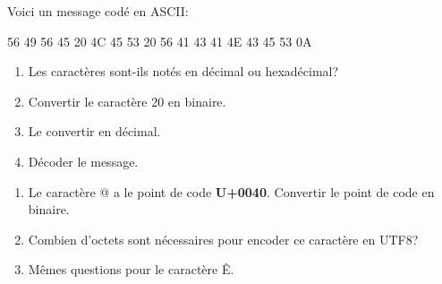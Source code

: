 \documentclass[a4paper,11pt]{article}
\begin{document}
\begin{exo}
Voici un message codé en ASCII:
\begin{center}
    56 49 56 45 20 4C 45 53 20 56 41 43 41 4E 43 45 53 0A
\end{center}
\begin{enumerate}
    \item Les caractères sont-ils notés en décimal ou hexadécimal?
    \item Convertir le caractère 20 en binaire.
    \item Le convertir en décimal.
    \item Décoder le message.
\end{enumerate}
\end{exo}
\begin{exo}
\begin{enumerate}
    \item Le caractère @ a le point de code \textbf{U+0040}. Convertir le point de code en binaire.
    \item Combien d'octets sont nécessaires pour encoder ce caractère en UTF8?
    \item Mêmes questions pour le caractère Ê.
\end{enumerate}
\end{exo}
\end{document}
